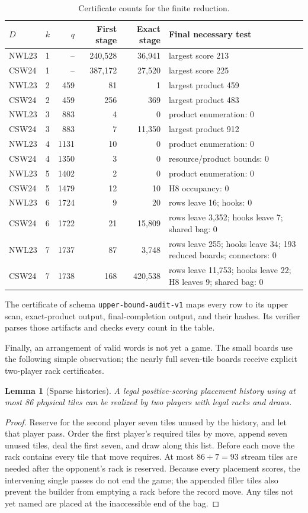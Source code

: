 \documentclass{article}
\theoremstyle{plain}
\newtheorem{lemma}[theorem]{Lemma}
\newcommand{\word}[1]{\texttt{#1}}
\begin{document}
\begin{table}[htbp]\centering\scriptsize
\caption{Certificate counts for the finite reduction.}\label{tab:audit}
\begin{tabular}{@{}llrrrp{}@{}}\toprule
$D$&$k$&$q$&First stage&Exact stage&Final necessary test\\\midrule
NWL23&1&--&240,528&36,941&largest score 213\\
CSW24&1&--&387,172&27,520&largest score 225\\
NWL23&2&459&81&1&largest product 459\\
CSW24&2&459&256&369&largest product 483\\
NWL23&3&883&4&0&product enumeration: 0\\
CSW24&3&883&7&11,350&largest product 912\\
NWL23&4&1131&10&0&product enumeration: 0\\
CSW24&4&1350&3&0&resource/product bounds: 0\\
NWL23&5&1402&2&0&product enumeration: 0\\
CSW24&5&1479&12&10&H8 occupancy: 0\\
NWL23&6&1724&9&20&rows leave 16; hooks: 0\\
CSW24&6&1722&21&15,809&rows leave 3,352; hooks leave 7; shared bag: 0\\
NWL23&7&1737&87&3,748&rows leave 255; hooks leave 34; 193 reduced boards; connectors: 0\\
CSW24&7&1738&168&420,538&rows leave 11,753; hooks leave 22; H8 leaves 9; shared bag: 0\\
\bottomrule
\end{tabular}
\end{table}

The certificate of schema \word{upper-bound-audit-v1} maps every row to its
upper scan, exact-product output, final-completion output, and their hashes.
Its verifier parses those artifacts and checks every count in the table.

Finally, an arrangement of valid words is not yet a game. The small boards use
the following simple observation; the nearly full seven-tile boards receive
explicit two-player rack certificates.

\begin{lemma}[Sparse histories]\label{lem:racks}
A legal positive-scoring placement history using at most 86 physical tiles can
be realized by two players with legal racks and draws.
\end{lemma}
\begin{proof}
Reserve for the second player seven tiles unused by the history, and let that
player pass. Order the first player's required tiles by move, append seven
unused tiles, deal the first seven, and draw along this list. Before each move
the rack contains every tile that move requires. At most $86+7=93$ stream tiles
are needed after the opponent's rack is reserved. Because every placement
scores, the intervening single passes do not end the game; the appended filler
tiles also prevent the builder from emptying a rack before the record move.
Any tiles not yet named are placed at the inaccessible end of the bag.
\end{proof}
\end{document}
